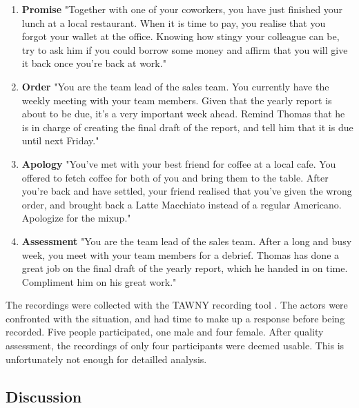 \begin{enumerate}
    \item \textbf{Promise} "Together with one of your coworkers, you have just finished your lunch at a local restaurant. When it is time to pay, you realise that you forgot your wallet at the office. Knowing how stingy your colleague can be, try to ask him if you could borrow some money and affirm that you will give it back once you’re back at work."
    \item \textbf{Order} "You are the team lead of the sales team. You currently have the weekly meeting with your team members. Given that the yearly report is about to be due, it’s a very important week ahead. Remind Thomas that he is in charge of creating the final draft of the report, and tell him that it is due until next Friday."
    \item \textbf{Apology} "You’ve met with your best friend for coffee at a local cafe. You offered to fetch coffee for both of you and bring them to the table. After you’re back and have settled, your friend realised that you’ve given the wrong order, and brought back a Latte Macchiato instead of a regular Americano. Apologize for the mixup."
    \item \textbf{Assessment} "You are the team lead of the sales team. After a long and busy week, you meet with your team members for a debrief. Thomas has done a great job on the final draft of the yearly report, which he handed in on time. Compliment him on his great work."
\end{enumerate}

The recordings were collected with the TAWNY recording tool \cite{tawny2021}. The actors were confronted with the situation, and had time to make up a response before being recorded. Five people participated, one male and four female. After quality assessment, the recordings of only four participants were deemed usable. This is unfortunately not enough for detailled analysis.

\subsection{Discussion}
\label{sec:data_discussion}

